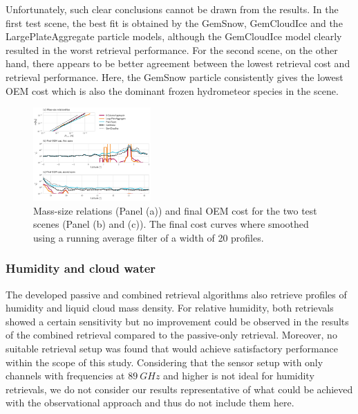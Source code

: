 \documentclass[journal abbreviation, manuscript]{copernicus}
\begin{document}
Unfortunately, such clear conclusions cannot be drawn from the results. In the
first test scene, the best fit is obtained by the GemSnow, GemCloudIce and the
LargePlateAggregate particle models, although the GemCloudIce model clearly
resulted in the worst retrieval performance. For the second scene, on the other
hand, there appears to be better agreement between the lowest retrieval cost and
retrieval performance. Here, the GemSnow particle consistently gives the lowest
OEM cost which is also the dominant frozen hydrometeor species in the scene.

\begin{figure}
\centering
\includegraphics[width = 0.4\textwidth]{../plots/costs}
\caption{Mass-size relations (Panel (a)) and final OEM cost for the two test scenes
  (Panel (b) and (c)). The final cost curves where smoothed using a running average filter
of a width of 20 profiles.}
\label{fig:costs}
\end{figure}


\subsubsection{Humidity and cloud water}

The developed passive and combined retrieval algorithms also retrieve profiles
of humidity and liquid cloud mass density. For relative humidity, both
retrievals showed a certain sensitivity but no improvement could be observed in
the results of the combined retrieval compared to the passive-only retrieval.
Moreover, no suitable retrieval setup was found that would achieve satisfactory
performance within the scope of this study. Considering that the sensor setup
with only channels with frequencies at $89\ \unit{GHz}$ and higher is not ideal for
humidity retrievals, we do not consider our results representative of what could
be achieved with the observational approach and thus do not include them here.
\end{document}

